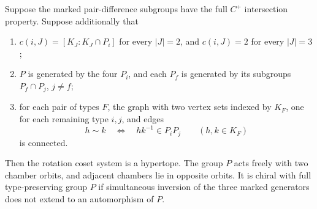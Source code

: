 \begin{proposition}
Suppose the marked pair-difference subgroups have the full $C^+$ intersection
property. Suppose additionally that
\begin{enumerate}
\item $c(i,J)=[K_J:K_J\cap P_i]$ for every $|J|=2$, and
$c(i,J)=2$ for every $|J|=3$;
\item $P$ is generated by the four $P_i$, and each $P_f$ is generated by
its subgroups $P_f\cap P_j$, $j\ne f$;
\item for each pair of types $F$, the graph with two vertex sets indexed
by $K_F$, one for each remaining type $i,j$, and edges
\[
 h\sim k\quad\Longleftrightarrow\quad hk^{-1}\in P_iP_j
 \qquad(h,k\in K_F)
\]
is connected.
\end{enumerate}
Then the rotation coset system is a hypertope. The group $P$ acts freely
with two chamber orbits, and adjacent chambers lie in opposite orbits.
It is chiral with full type-preserving group $P$ if simultaneous inversion
of the three marked generators does not extend to an automorphism of $P$.
\end{proposition}
